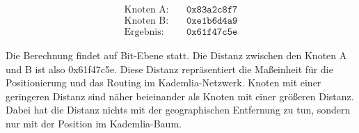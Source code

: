 \begin{equation}
    \begin{aligned}
        \text{Knoten A:} & \quad \texttt{0x83a2c8f7} \\
        \text{Knoten B:} & \quad \texttt{0xe1b6d4a9} \\
        \text{Ergebnis:} & \quad \texttt{0x61f47c5e}
    \end{aligned}
\end{equation}

\noindent Die Berechnung findet auf Bit-Ebene statt. Die Distanz zwischen den Knoten A und B ist also 0x61f47c5e. Diese Distanz repräsentiert die Maßeinheit für die Positionierung und das Routing im Kademlia-Netzwerk. Knoten mit einer geringeren Distanz sind näher beieinander als Knoten mit einer größeren Distanz. Dabei hat die Distanz nichts mit der geographischen Entfernung zu tun, sondern nur mit der Position im Kademlia-Baum.
\\

